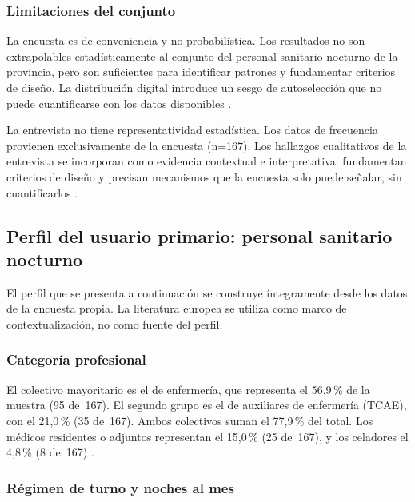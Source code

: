 \subsubsection{Limitaciones del conjunto}
\label{sec:limitaciones-conjunto}

La encuesta es de conveniencia y no probabilística. Los resultados no son extrapolables estadísticamente al conjunto del personal sanitario nocturno de la provincia, pero son suficientes para identificar patrones y fundamentar criterios de diseño. La distribución digital introduce un sesgo de autoselección que no puede cuantificarse con los datos disponibles \parencite{LouridoRegueira2026}.

La entrevista no tiene representatividad estadística. Los datos de frecuencia provienen exclusivamente de la encuesta (n=167). Los hallazgos cualitativos de la entrevista se incorporan como evidencia contextual e interpretativa: fundamentan criterios de diseño y precisan mecanismos que la encuesta solo puede señalar, sin cuantificarlos \parencite{LouridoRegueira2026}.

\subsection{Perfil del usuario primario: personal sanitario nocturno}
\label{sec:perfil-usuario}

El perfil que se presenta a continuación se construye íntegramente desde los datos de la encuesta propia. La literatura europea se utiliza como marco de contextualización, no como fuente del perfil.

\subsubsection{Categoría profesional}
\label{sec:categoria-profesional}

El colectivo mayoritario es el de enfermería, que representa el 56{,}9\,\% de la muestra (95 de~167). El segundo grupo es el de auxiliares de enfermería (\acs{TCAE}), con el 21{,}0\,\% (35 de~167). Ambos colectivos suman el 77{,}9\,\% del total. Los médicos residentes o adjuntos representan el 15{,}0\,\% (25 de~167), y los celadores el 4{,}8\,\% (8 de~167) \parencite{LouridoRegueira2026}.

\subsubsection{Régimen de turno y noches al mes}
\label{sec:regimen-turno}

